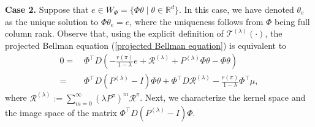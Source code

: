 \documentclass[11 pt]{article}
\begin{document}
	\textbf{Case 2.} Suppose that $e \in W_{\Phi} =\{\Phi\theta\mid \theta\in\mathbb{R}^d\}$. In this case, we have denoted $\theta_e$ as the unique solution to $\Phi \theta_e = e$, where the uniqueness follows from $\Phi$ being full column rank. Observe that, using the explicit definition of $\mathcal{T}^{(\lambda)}(\cdot)$, the projected Bellman equation (\ref{projected Bellman equation}) is equivalent to 
	\begin{align}
		0 =\,&\Phi^\top D \left(-\frac{r(\pi)}{1-\lambda}e+\mathcal{R}^{(\lambda)}+P^{(\lambda)} \Phi \theta -\Phi\theta\right)\nonumber\\
		=\,&\Phi^\top D(P^{(\lambda)}-I)\Phi\theta+\Phi^\top D\mathcal{R}^{(\lambda)}-\frac{r(\pi)}{1-\lambda}\Phi^\top \mu,\label{equation:PBE_Equivalent}
	\end{align}
	where $\mathcal{R}^{(\lambda)}:=\sum_{m=0}^\infty(\lambda P^\pi)^m\mathcal{R}^\pi$.
	Next, we characterize the kernel space and the image space of the matrix $\Phi^\top D(P^{(\lambda)}-I)\Phi$. 
	
\end{document}
